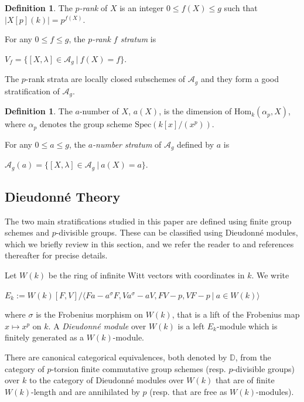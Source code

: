 \documentclass[11pt,table]{amsart}
\numberwithin{equation}{section}
\theoremstyle{definition}
\newtheorem{defn}[thm]{Definition}
\theoremstyle{remark}
\theoremstyle{remark}
\begin{document}
\begin{defn}  The \textit{$p$-rank} of $X$ is an integer $0 \le f(X) \le g$ such that $\vert X[p](k) \vert = p^{f(X)}$.  
\end{defn}
  For any $0 \le f \le g$, the \textit{$p$-rank $f$ stratum} is 
     \begin{center}
         $V_f = \{ [X, \lambda] \in \mathcal{A}_g \ \vert \ f(X) = f \}$.
   \end{center}
 The $p$-rank strata are locally closed subschemes of $\mathcal{A}_g$ and they form a good stratification of $\mathcal{A}_g$.
\begin{defn}
    The $a$-number of $X$, $a(X)$, is the dimension of $\text{Hom}_{k}(\alpha_p, X)$, where $\alpha_p$ denotes the group scheme $\mathrm{Spec}(k[x]/(x^p))$.
 \end{defn}
 For any $0 \le a \le g$, the \textit{$a$-number stratum} of $\mathcal{A}_g$  defined by $a$ is \begin{center}
     $\mathcal{A}_g(a) = \{ [ X, \lambda] \in \mathcal{A}_g \ \vert \  a(X) = a\}. $
 \end{center}
 \subsection{Dieudonn{\'e} Theory} \label{ss: Dd}
 The two main stratifications studied in this paper are defined using finite group schemes and $p$-divisible groups. These can be classified using Dieudonn{\'e} modules, which we briefly review in this section, and we refer the reader to \cite[Section 15.3]{oort2001stratification} and references thereafter for precise details. 
 
 Let $W(k)$ be the ring of infinite Witt vectors with coordinates in $k$. We write
  \begin{center}
      $E_k := W(k)[ F, V]/ \langle Fa  - a^{\sigma} F, V a^{\sigma} - a V, FV - p, VF - p \ \vert \ a \in W(k) \rangle $
  \end{center}
 where $\sigma$ is the Frobenius morphism on $W(k)$, that is a lift of the Frobenius map $x \mapsto x^p$ on $k$.
 A \textit{Dieudonn{\'e} module} over $W(k)$ is a left $E_{k}$-module which is finitely generated as a $W(k)$-module. 

There are canonical categorical equivalences, both denoted by $\mathbb{D}$, from the category of $p$-torsion finite commutative group schemes (resp. $p$-divisible groups) over $k$ to the category of Dieudonn{\'e} modules over $W(k)$ that are of finite $W(k)$-length and are annihilated by $p$ (resp. that are free as $W(k)$-modules).
\end{document}
